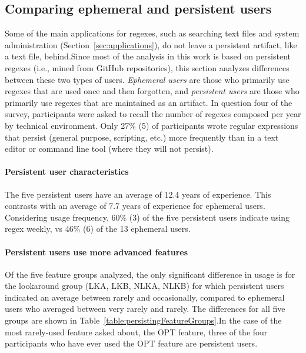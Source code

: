 \subsection{Comparing ephemeral and persistent users}
Some of the main applications for regexes, such as searching text files and system administration (Section~\ref{sec:applications}), do not leave a persistent artifact, like a text file, behind.Since most of the analysis in this work is based on persistent regexes (i.e., mined from GitHub repositories), this section analyzes differences between these two types of users.  \emph{Ephemeral users} are those who primarily use regexes that are used once and then forgotten, and \emph{persistent users} are those who primarily use regexes that are maintained as an artifact.  In question four of the survey, participants were asked to recall the number of regexes composed per year by technical environment. Only 27\% (5)
of participants wrote regular expressions that persist (general purpose, scripting, etc.) more frequently than in a text editor or command line tool (where they will not persist).

\paragraph{Persistent user characteristics} The five persistent users have an average of 12.4 years of experience.  This contrasts with an average of 7.7 years of experience for ephemeral users.  Considering usage frequency, 60\% (3) of the five persistent users indicate using regex weekly, vs 46\% (6) of the 13 ephemeral users.





\paragraph{Persistent users use more advanced features} Of the five feature groups analyzed, the only significant difference in usage is for the lookaround group (LKA, LKB, NLKA, NLKB) for which persistent users indicated an average between rarely and occasionally, compared to ephemeral users who averaged between very rarely and rarely.  The differences for all five groups are shown in Table~\ref{table:persistingFeatureGroups}.In the case of the most rarely-used feature asked about, the OPT feature, three of the four participants who have ever used the OPT feature are persistent users.

